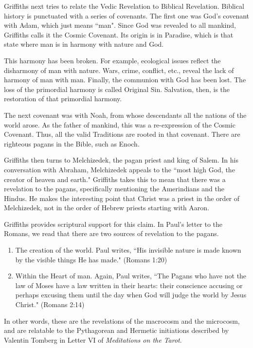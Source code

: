 Griffiths next tries to relate the Vedic Revelation to Biblical Revelation. Biblical history is punctuated with a series of covenants. The first one was God's covenant with Adam, which just means ``man". Since God was revealed to all mankind, Griffiths calls it the Cosmic Covenant. Its origin is in Paradise, which is that state where man is in harmony with nature and God.

This harmony has been broken. For example, ecological issues reflect the disharmony of man with nature. Wars, crime, conflict, etc., reveal the lack of harmony of man with man. Finally, the communion with God has been lost. The loss of the primordial harmony is called Original Sin. Salvation, then, is the restoration of that primordial harmony.

The next covenant was with Noah, from whose descendants all the nations of the world arose. As the father of mankind, this was a re-expression of the Cosmic Covenant. Thus, all the valid Traditions are rooted in that covenant. There are righteous pagans in the Bible, such as Enoch.

Griffiths then turns to Melchizedek, the pagan priest and king of Salem. In his conversation with Abraham, Melchizedek appeals to the ``most high God, the creator of heaven and earth." Griffiths takes this to mean that there was a revelation to the pagans, specifically mentioning the Amerindians and the Hindus. He makes the interesting point that Christ was a priest in the order of Melchizedek, not in the order of Hebrew priests starting with Aaron.

Griffiths provides scriptural support for this claim. In Paul's letter to the Romans, we read that there are two sources of revelation to the pagans.

\begin{enumerate}
\item The creation of the world. Paul writes, ``His invisible nature is made known by the visible things He has made." (Romans 1:20) 
\item Within the Heart of man. Again, Paul writes, ``The Pagans who have not the law of Moses have a law written in their hearts: their conscience accusing or perhaps excusing them until the day when God will judge the world by Jesus Christ." (Romans 2:14) 
\end{enumerate}
In other words, these are the revelations of the macrocosm and the microcosm, and are relatable to the Pythagorean and Hermetic initiations described by Valentin Tomberg in Letter VI of \emph{Meditations on the Tarot}.

